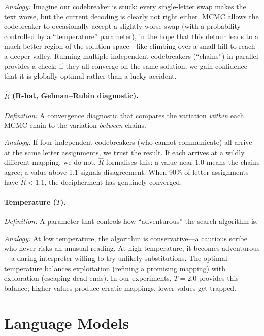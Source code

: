 \documentclass[11pt,a4paper]{article}
\begin{document}
\textit{Analogy:} Imagine our codebreaker is stuck: every single-letter swap makes the text worse, but the current decoding is clearly not right either.  MCMC allows the codebreaker to occasionally accept a slightly worse swap (with a probability controlled by a ``temperature'' parameter), in the hope that this detour leads to a much better region of the solution space---like climbing over a small hill to reach a deeper valley.  Running multiple independent codebreakers (``chains'') in parallel provides a check: if they all converge on the same solution, we gain confidence that it is globally optimal rather than a lucky accident.

\paragraph{$\hat{R}$ (R-hat, Gelman--Rubin diagnostic).}
\textit{Definition:} A convergence diagnostic that compares the variation \textit{within} each MCMC chain to the variation \textit{between} chains.

\textit{Analogy:} If four independent codebreakers (who cannot communicate) all arrive at the same letter assignments, we trust the result.  If each arrives at a wildly different mapping, we do not.  $\hat{R}$ formalises this: a value near 1.0 means the chains agree; a value above 1.1 signals disagreement.  When 90\% of letter assignments have $\hat{R} < 1.1$, the decipherment has genuinely converged.

\paragraph{Temperature ($T$).}
\textit{Definition:} A parameter that controls how ``adventurous'' the search algorithm is.

\textit{Analogy:} At low temperature, the algorithm is conservative---a cautious scribe who never risks an unusual reading.  At high temperature, it becomes adventurous---a daring interpreter willing to try unlikely substitutions.  The optimal temperature balances exploitation (refining a promising mapping) with exploration (escaping dead ends).  In our experiments, $T = 2.0$ provides this balance; higher values produce erratic mappings, lower values get trapped.


\section{Language Models}
\end{document}
